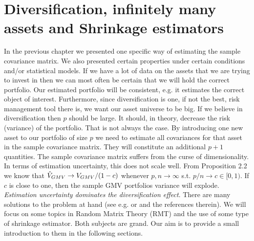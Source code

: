 \documentclass[]{book}\usepackage{knitr}
\begin{document}
\chapter{Diversification, infinitely many assets and Shrinkage estimators}\label{ch:highdim}


In the previous chapter we presented one specific way of estimating the sample covariance matrix.
We also presented certain properties under certain conditions and/or statistical models.
If we have a lot of data on the assets that we are trying to invest in then we can most often be certain that we will hold the correct portfolio.
Our estimated portfolio will be consistent, e.g. it estimates the correct object of interest. 
Furthermore, since diversification is one, if not the best, risk management tool there is, we want our asset universe to be big.
If we believe in diversification then $p$ should be large. 
It should, in theory, decrease the risk (variance) of the portfolio. 
That is not always the case.
By introducing one new asset to our portfolio of size $p$ we need to estimate all covariances for that asset in the sample covariance matrix. 
They will constitute an additional $p+1$ quantities. 
The sample covariance matrix suffers from the curse of dimensionality. 
In terms of estimation uncertainty, this does not scale well.
From \citet{bodnar2016optimal} Proposition 2.2 we know that $\hat{V}_{GMV} \rightarrow V_{GMV}/(1-c)$ whenever $p,n \rightarrow \infty$ s.t. $p/n \rightarrow c \in [0,1)$. If $c$ is close to one, then the sample GMV portfolios variance will explode. \textit{Estimation uncertainty dominates the diversification effect}. There are many solutions to the problem at hand (see e.g. \citet{lw17} or \citet{bodnar2021recent} and the references therein). We will focus on some topics in Random Matrix Theory (RMT) and the use of some type of shrinkage estimator. Both subjects are grand. Our aim is to provide a small introduction to them in the following sections.
\end{document}
